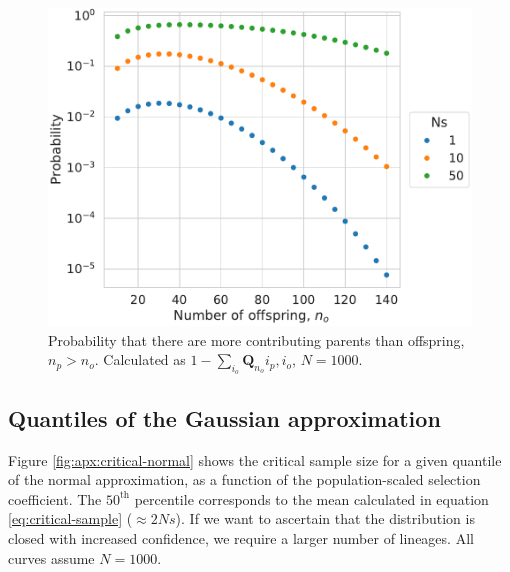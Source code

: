 \documentclass[review]{elsarticle}
\begin{document}
\begin{figure}
  \centering
  \includegraphics[width=\textwidth]{fig/missing.pdf}
  \caption{Probability that there are more contributing parents than offspring, $n_p > n_o$.
    Calculated as $1-\sum_{i_o} \mathbf{Q}_{n_o}{i_p, i_o}$, $N=1000$.}
  \label{fig:apx:missing}
\end{figure}

\subsection{Quantiles of the Gaussian approximation}

Figure \ref{fig:apx:critical-normal} shows the critical sample size for a given quantile of the normal
approximation, as a function of the population-scaled selection coefficient. The $50^{\text{th}}$
percentile corresponds to the mean calculated in equation \ref{eq:critical-sample} ($\approx 2Ns$).
If we want to ascertain that the distribution is closed with increased confidence, we require a
larger number of lineages. All curves assume $N=1000$.
\end{document}
